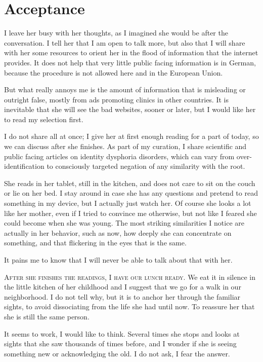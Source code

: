 \chapter*{Acceptance}\label{acceptance}

I leave her busy with her thoughts, as I imagined she would be after the conversation. I tell her that I am open to talk more, but also that I will share with her some resources to orient her in the flood of information that the internet provides. It does not help that very little public facing information is in German, because the procedure is not allowed here and in the European Union.

But what really annoys me is the amount of information that is misleading or outright false, mostly from ads promoting clinics in other countries. It is inevitable that she will see the bad websites, sooner or later, but I would like her to read my selection first. 

I do not share all at once; I give her at first enough reading for a part of today, so we can discuss after she finishes. As part of my curation, I share scientific and public facing articles on identity dysphoria disorders, which can vary from over-identification to consciously targeted negation of any similarity with the root. 

She reads in her tablet, still in the kitchen, and does not care to sit on the couch or lie on her bed. I stay around in case she has any questions and pretend to read something in my device, but I actually just watch her. Of course she looks a lot like her mother, even if I tried to convince me otherwise, but not like I feared she could become when she was young. The most striking similarities I notice are actually in her behavior, such as now, how deeply she can concentrate on something, and that flickering in the eyes that is the same.

It pains me to know that I will never be able to talk about that with her.

\bigskip\thinspace\noindent\textsc{After she finishes the readings, I have our lunch ready.} We eat it in silence in the little kitchen of her childhood and I suggest that we go for a walk in our neighborhood. I do not tell why, but it is to anchor her through the familiar sights, to avoid dissociating from the life she had until now. To reassure her that she is still the same person.

It seems to work, I would like to think. Several times she stops and looks at sights that she saw thousands of times before, and I wonder if she is seeing something new or acknowledging the old. I do not ask, I fear the answer.